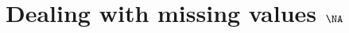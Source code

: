 \documentclass{article}
\begin{document}
\section{Dealing with missing values $\NA$}
\end{document}
